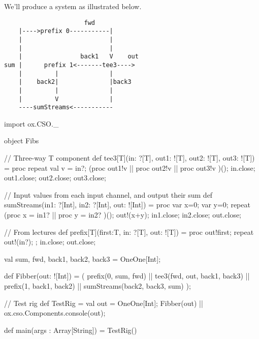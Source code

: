\begin{answer}
We'll produce a system as illustrated below.
\begin{verbatim}
                      fwd
    |---->prefix 0-----------|  
    |                        |
    |                        |
    |                back1   V    out
sum |      prefix 1<-------tee3---->
    |         |              |
    |    back2|              |back3
    |         |              |
    |         V              |
    ----sumStreams<-----------                           
\end{verbatim}
\begin{scala}
import ox.CSO._

object Fibs{

  // Three-way T component
  def tee3[T](in: ?[T], out1: ![T], out2: ![T], out3: ![T]) = proc{
    repeat{
      val v = in?; 
      (proc{ out1!v } || proc{ out2!v } || proc{ out3!v })();
    }
    in.close; out1.close; out2.close; out3.close;
  } 

  // Input values from each input channel, and output their sum
  def sumStreams(in1: ?[Int], in2: ?[Int], out: ![Int]) = proc{
    var x=0; var y=0;
    repeat{
      (proc{ x = in1? } || proc{ y = in2? })();
      out!(x+y); 
    }
    in1.close; in2.close; out.close;
  }

  // From lectures
  def prefix[T](first:T, in: ?[T], out: ![T]) = proc{
    out!first;
    repeat{ out!(in?); };
    in.close; out.close;
  }

  val sum, fwd, back1, back2, back3 = OneOne[Int];

  def Fibber(out: ![Int]) = (
    prefix(0, sum, fwd) || tee3(fwd, out, back1, back3) ||
    prefix(1, back1, back2) || sumStreams(back2, back3, sum)
  );

  // Test rig
  def TestRig = {
    val out = OneOne[Int];
    Fibber(out) || ox.cso.Components.console(out);
  }

  def main(args : Array[String]) = TestRig()
}
\end{scala}
\end{answer}

